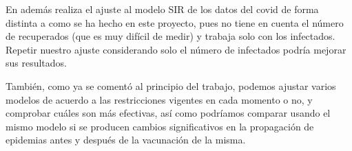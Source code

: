 En \cite{enrique_amaro} además realiza el ajuste al modelo SIR de los datos del covid de forma distinta a como se ha hecho en este proyecto, pues no tiene en cuenta el número de recuperados (que es muy difícil de medir) y trabaja solo con los infectados. Repetir nuestro ajuste considerando solo el número de infectados podría mejorar sus resultados.

También, como ya se comentó al principio del trabajo, podemos ajustar varios modelos de acuerdo a las restricciones vigentes en cada momento o no, y comprobar cuáles son más efectivas, así como podríamos comparar usando el mismo modelo si se producen cambios significativos en la propagación de epidemias antes y después de la vacunación de la misma.








